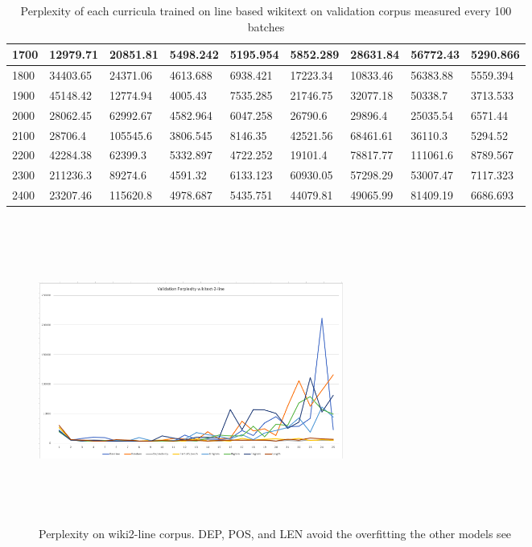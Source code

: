 \begin{table}[]
{\begin{tabular}{|l|l|l|l|l|l|l|l|l|}
1700 & 12979.71 & 20851.81 & 5498.242 & 5195.954 & 5852.289 & 28631.84 & 56772.43 & 5290.866 \\ \hline
1800 & 34403.65 & 24371.06 & 4613.688 & 6938.421 & 17223.34 & 10833.46 & 56383.88 & 5559.394 \\ \hline
1900 & 45148.42 & 12774.94 & 4005.43 & 7535.285 & 21746.75 & 32077.18 & 50338.7 & 3713.533 \\ \hline
2000 & 28062.45 & 62992.67 & 4582.964 & 6047.258 & 26790.6 & 29896.4 & 25035.54 & 6571.44 \\ \hline
2100 & 28706.4 & 105545.6 & 3806.545 & 8146.35 & 42521.56 & 68461.61 & 36110.3 & 5294.52 \\ \hline
2200 & 42284.38 & 62399.3 & 5332.897 & 4722.252 & 19101.4 & 78817.77 & 111061.6 & 8789.567 \\ \hline
2300 & 211236.3 & 89274.6 & 4591.32 & 6133.123 & 60930.05 & 57298.29 & 53007.47 & 7117.323 \\ \hline
2400 & 23207.46 & 115620.8 & 4978.687 & 5435.751 & 44079.81 & 49065.99 & 81409.19 & 6686.693 \\ \hline
\end{tabular}
}
\caption{Perplexity of each curricula trained on line based wikitext on validation corpus measured every 100 batches}
\label{tab:wikitext2-line-perplexity}
\end{table}

\begin{figure}[h]
\centering
\includegraphics[width=10cm, height=10cm]{Thesis/images/wiki2-line-valid.png}
\caption{Perplexity on wiki2-line corpus. DEP, POS, and LEN avoid the overfitting the other models see}
\end{figure}

